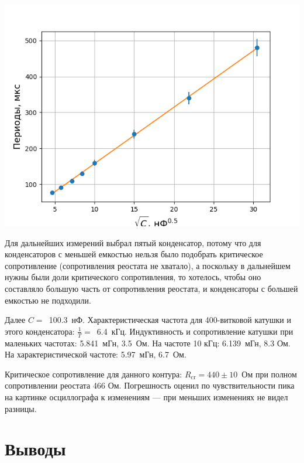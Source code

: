\documentclass[a4paper, 12pt]{article}
\begin{document}
\begin{center}
\includegraphics[width=0.5\linewidth]{check_periods.png}
\end{center}

Для дальнейших измерений выбрал пятый конденсатор, потому что для конденсаторов с меньшей емкостью нельзя было подобрать критическое сопротивление (сопротивления реостата не хватало), а поскольку в дальнейшем нужны были доли критического сопротивления, то хотелось, чтобы оно составляло большую часть от сопротивления реостата, и конденсаторы с большей емкостью не подходили.

Далее $C =$~100.3~нФ.
Характеристическая частота для 400-витковой катушки и этого конденсатора: $\frac{1}{T} =$~6.4~кГц.
Индуктивность и сопротивление катушки при маленьких частотах: 5.841~мГн, 3.5~Ом.
На частоте 10 кГц: 6.139~мГн, 8.3 Ом.
На характеристической частоте: 5.97~мГн, 6.7~Ом.

Критическое сопротивление для данного контура: $R_{\text{cr}} = 440 \pm 10$~Ом при полном сопротивлении реостата 466 Ом.
Погрешность оценил по чувствительности пика на картинке осциллографа к изменениям --- при меньших изменениях не видел разницы.

\section{Выводы}
\end{document}
